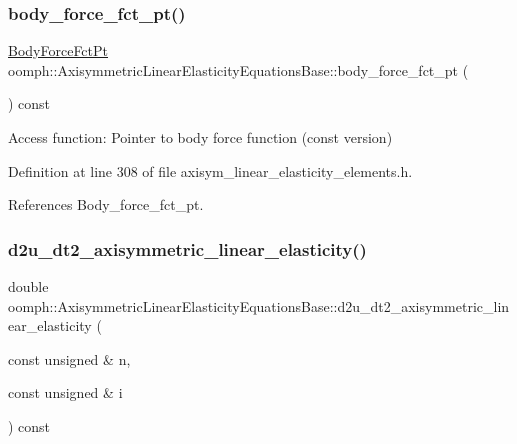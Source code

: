 \subsubsection{\texorpdfstring{body\+\_\+force\+\_\+fct\+\_\+pt()}{body\_force\_fct\_pt()}\hspace{0.1cm}{\footnotesize\ttfamily [2/2]}}
{\footnotesize\ttfamily \hyperlink{classoomph_1_1AxisymmetricLinearElasticityEquationsBase_afa35b69a888eecae4b5f199a1adf88c5}{Body\+Force\+Fct\+Pt} oomph\+::\+Axisymmetric\+Linear\+Elasticity\+Equations\+Base\+::body\+\_\+force\+\_\+fct\+\_\+pt (\begin{DoxyParamCaption}{ }\end{DoxyParamCaption}) const\hspace{0.3cm}{\ttfamily [inline]}}



Access function\+: Pointer to body force function (const version) 



Definition at line 308 of file axisym\+\_\+linear\+\_\+elasticity\+\_\+elements.\+h.



References Body\+\_\+force\+\_\+fct\+\_\+pt.

\mbox{\label{classoomph_1_1AxisymmetricLinearElasticityEquationsBase_a352c704cb283b27e5c4d8549f5e380d7}} 
\subsubsection{\texorpdfstring{d2u\+\_\+dt2\+\_\+axisymmetric\+\_\+linear\+\_\+elasticity()}{d2u\_dt2\_axisymmetric\_linear\_elasticity()}}
{\footnotesize\ttfamily double oomph\+::\+Axisymmetric\+Linear\+Elasticity\+Equations\+Base\+::d2u\+\_\+dt2\+\_\+axisymmetric\+\_\+linear\+\_\+elasticity (\begin{DoxyParamCaption}\item[{const unsigned \&}]{n,  }\item[{const unsigned \&}]{i }\end{DoxyParamCaption}) const\hspace{0.3cm}{\ttfamily [inline]}}



